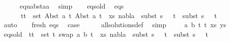 \begin{isabellebody}
\ \ \ \ \isamarkupfalse%
\ equ{\isacharunderscore}{\kern0pt}abst{\isacharunderscore}{\kern0pt}aa\ \isamarkupfalse%
\ simp\isanewline
\ \ \isamarkupfalse%
\ eqs{\isacharunderscore}{\kern0pt}old\ \isamarkupfalse%
\ eqs{\isacharcolon}{\kern0pt}\isanewline
\ \ \ \ \ {\isachardoublequoteopen}{\isasymforall}\ {\isacharparenleft}{\kern0pt}t{}{\isacharcomma}{\kern0pt}t{}{\isacharparenright}{\kern0pt}\ {\isasymin}\ set\ {\isacharparenleft}{\kern0pt}{\isacharparenleft}{\kern0pt}Abst\ a\ t{}{\isacharcomma}{\kern0pt}\ Abst\ a\ t{}{\isacharparenright}{\kern0pt}\ {\isacharhash}{\kern0pt}\ xs{\isacharparenright}{\kern0pt}{\isachardot}{\kern0pt}\ nabla{}\ {\isasymturnstile}\ subst\ {\isacharparenleft}{\kern0pt}s{}\ {\isasymbullet}\ {\isacharbrackleft}{\kern0pt}{\isacharbrackright}{\kern0pt}{\isacharparenright}{\kern0pt}\ t{}\ {\isasymapprox}\ subst\ {\isacharparenleft}{\kern0pt}s{}\ {\isasymbullet}\ {\isacharbrackleft}{\kern0pt}{\isacharbrackright}{\kern0pt}{\isacharparenright}{\kern0pt}\ t{}{\isachardoublequoteclose}\isanewline
\ \ \ \ \ \isamarkupfalse%
\ auto\isanewline
\ \ \isamarkupfalse%
\ fresh\ eqs\ \isamarkupfalse%
\ {\isacharquery}{\kern0pt}case\isanewline
\ \ \ \ \isamarkupfalse%
\ all{\isacharunderscore}{\kern0pt}solutions{\isacharunderscore}{\kern0pt}def\ \isamarkupfalse%
\ simp\isanewline
{}\isamarkupfalse%
\isanewline
\ \ \isamarkupfalse%
\ {\isacharparenleft}{\kern0pt}{}\ a\ b\ t{}\ t{}\ xs\ ys{\isacharparenright}{\kern0pt}\isanewline
\ \ \isamarkupfalse%
\ eqs{\isacharunderscore}{\kern0pt}old{\isacharcolon}{\kern0pt}\ {\isachardoublequoteopen}{\isasymforall}\ {\isacharparenleft}{\kern0pt}t{}{\isacharcomma}{\kern0pt}t{}{\isacharparenright}{\kern0pt}\ {\isasymin}\ set\ {\isacharparenleft}{\kern0pt}{\isacharparenleft}{\kern0pt}t{}{\isacharcomma}{\kern0pt}\ swap\ {\isacharbrackleft}{\kern0pt}{\isacharparenleft}{\kern0pt}a{\isacharcomma}{\kern0pt}\ b{\isacharparenright}{\kern0pt}{\isacharbrackright}{\kern0pt}\ t{}{\isacharparenright}{\kern0pt}\ {\isacharhash}{\kern0pt}\ xs{\isacharparenright}{\kern0pt}{\isachardot}{\kern0pt}\ nabla{}\ {\isasymturnstile}\ subst\ {\isacharparenleft}{\kern0pt}s{}\ {\isasymbullet}\ {\isacharbrackleft}{\kern0pt}{\isacharbrackright}{\kern0pt}{\isacharparenright}{\kern0pt}\ t{}\ {\isasymapprox}\ subst\ {\isacharparenleft}{\kern0pt}s{}\ {\isasymbullet}\ {\isacharbrackleft}{\kern0pt}{\isacharbrackright}{\kern0pt}{\isacharparenright}{\kern0pt}\ t{}{\isachardoublequoteclose}\ \isanewline

\end{isabellebody}
